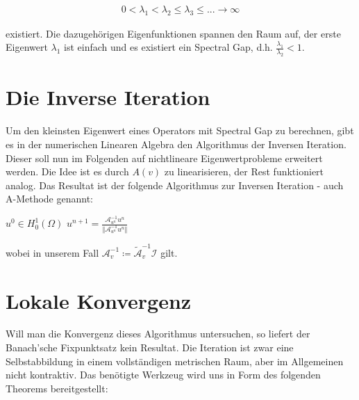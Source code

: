 \documentclass[final,bibliography=totocnumbered]{include/seminar}
\newcommand{\Honez}{\ensuremath{{H^1_0(\Omega)}}}
\newcommand{\mA}{\ensuremath{\mathcal{A}}}
\newcommand{\mAh}{\ensuremath{\mathcal{\tilde{A}}}}
\newcommand{\mI}{\ensuremath{\mathcal{I}}}
\theoremstyle{break}
\begin{document}
\begin{align*}
    0 < \lambda_1 < \lambda_2 \leq \lambda_3 \leq ... \rightarrow \infty
\end{align*}

existiert. Die dazugehörigen Eigenfunktionen spannen den Raum auf,
der erste Eigenwert $\lambda_1$ ist einfach und es existiert
ein Spectral Gap, d.h. $\frac{\lambda_1}{\lambda_2} < 1$.\cite{evans}

\section{Die Inverse Iteration}

Um den kleinsten Eigenwert eines Operators mit Spectral Gap zu berechnen,
gibt es in der numerischen Linearen Algebra den Algorithmus der Inversen Iteration.
Dieser soll nun im Folgenden auf nichtlineare Eigenwertprobleme erweitert werden.
Die Idee ist es durch $A(v)$ zu linearisieren, der Rest funktioniert analog.
Das Resultat ist der folgende Algorithmus zur Inversen Iteration - auch A-Methode genannt:

\begin{algorithm}[H]
    \caption{Inverse Iteration (A-Methode)}
    \begin{algorithmic}[1]
        \STATE $u^0 \in \Honez$
        \STATE $u^{n+1} = \frac
        {\mA_{u^n}^{-1} u^n}
        {\Vert \mA_{u^n}^{-1} u^n \Vert}$
        \ENDFOR
    \end{algorithmic}
\end{algorithm}

wobei in unserem Fall $\mA_v^{-1} \coloneq \mAh_v^{-1}\mI$ gilt.

\section{Lokale Konvergenz}

Will man die Konvergenz dieses Algorithmus untersuchen, so liefert der Banach'sche
Fixpunktsatz kein Resultat. Die Iteration ist zwar eine Selbstabbildung in einem
vollständigen metrischen Raum, aber im Allgemeinen nicht kontraktiv.
Das benötigte Werkzeug wird uns in Form des folgenden Theorems bereitgestellt:
\end{document}
